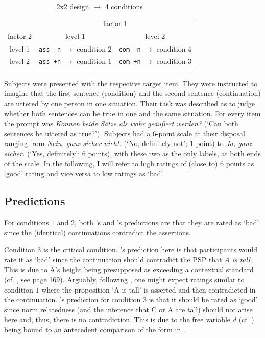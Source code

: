 \documentclass[output=paper
,modfonts
,nonflat]{langsci/langscibook}
\begin{document}
\begin{table}
\begin{tabular}{ccc}
\lsptoprule                     
         & \multicolumn{2}{c}{factor 1}\\\cmidrule(lr){2-3}
factor 2 & level 1 & level 2 \\
\midrule
level 1 & \texttt{ass\_--n} $\rightarrow$ condition $2$ & \texttt{com\_--n} $\rightarrow$ condition $4$ \\
level 2 & \texttt{ass\_+n} $\rightarrow$ condition $1$ & \texttt{com\_+n} $\rightarrow$ condition $3$ \\
\lspbottomrule
\end{tabular}
\caption{2x2 design $\rightarrow$ 4 conditions}
\label{tab:factors_levels_conds}
\end{table}

\noindent Subjects were presented with the respective target item. They were instructed to imagine that the first sentence (condition) and the second sentence (continuation) are uttered by one person in one situation. Their task was described as to judge whether both sentences can be true in one and the same situation. For every item the prompt was \textit{Können beide Sätze als wahr geäußert werden?} (`Can both sentences be uttered as true?'). Subjects had a 6-point scale at their disposal ranging from \textit{Nein, ganz sicher nicht.} (`No, definitely not'; 1 point) to \textit{Ja, ganz sicher.} (`Yes, definitely'; 6 points), with these two as the only labels, at both ends of the scale. In the following, I will refer to high ratings of (close to) 6 points as `good' rating and vice versa to low ratings as `bad'.

\subsection{Predictions}
For conditions $1$ and $2$, both \citeauthor{Hofstetter2013}'s and \citeauthor{umbach2009a_comp}'s predictions are that they are rated as `bad' since the (identical) continuations contradict the assertions. 

Condition $3$ is the critical condition. \citeauthor{Hofstetter2013}'s prediction here is that participants would rate it as `bad' since the continuation should contradict the PSP that \textit{A is tall}. This is due to A's height being presupposed as exceeding a contextual standard (cf. , see page 169). Arguably, following \citeauthor{Hofstetter2013}, one might expect ratings similar to condition $1$ where the proposition `A is tall' is asserted and then contradicted in the continuation. \citeauthor{umbach2009a_comp}'s prediction for condition $3$ is that it should be rated as `good' since norm relatedness (and the inference that C or A are tall) should not arise here and, thus, there is no contradiction. This is due to the free variable $d$ (cf. ) being bound to an antecedent comparison of the form in .
\end{document}
